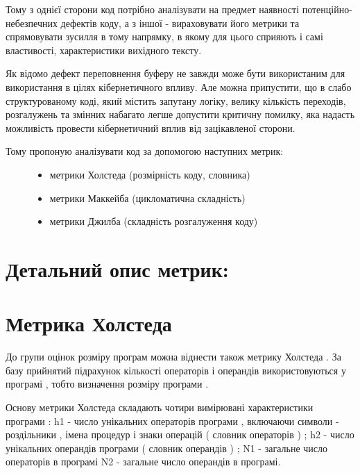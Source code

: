 \documentclass[oneside,final,14pt]{extreport}
\begin{document}
Тому з однієї сторони код потрібно аналізувати на предмет наявності потенційно-небезпечних дефектів коду, а з іншої - вираховувати його метрики та спрямовувати зусилля в тому напрямку, в якому для цього сприяють і самі властивості, характеристики вихідного тексту.

Як відомо дефект переповнення буферу не завжди може бути використаним для використання в цілях кібернетичного впливу.
Але можна припустити, що в слабо структурованому коді, який містить запутану логіку, велику кількість переходів, розгалужень та змінних набагато легше допустити критичну помилку, яка надасть можливість провести кібернетичний вплив від зацікавленої сторони.
\begin{description}
\item[{Тому пропоную аналізувати код за допомогою наступних метрик:}] \leavevmode\begin{itemize}
\item {} 
метрики Холстеда (розмірність коду, словника)

\item {} 
метрики Маккейба (цикломатична складність)

\item {} 
метрики Джилба (складність розгалуження коду)

\end{itemize}

\end{description}


\section{Детальний опис метрик:}
\label{2section:id9}

\section{Метрика Холстеда}
\label{2section:id10}
До групи оцінок розміру програм можна віднести також метрику Холстеда . За базу прийнятий підрахунок кількості операторів і операндів використовуються у програмі , тобто визначення розміру програми .

Основу метрики Холстеда складають чотири вимірювані характеристики програми : h1 - число унікальних операторів програми , включаючи символи - роздільники , імена процедур і знаки операцій ( словник операторів ) ; h2 - число унікальних операндів програми ( словник операндів ) ; N1 - загальне число операторів в програмі N2 - загальне число операндів в програмі.
\end{document}
